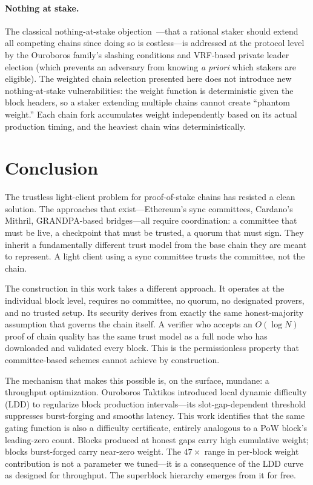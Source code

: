 \documentclass[11pt]{article}
\begin{document}
\paragraph{Nothing at stake.} The classical nothing-at-stake objection~\cite{ouroboros}---that a rational staker should extend all competing chains since doing so is costless---is addressed at the protocol level by the Ouroboros family's slashing conditions and VRF-based private leader election (which prevents an adversary from knowing \emph{a priori} which stakers are eligible). The weighted chain selection presented here does not introduce new nothing-at-stake vulnerabilities: the weight function is deterministic given the block headers, so a staker extending multiple chains cannot create ``phantom weight.'' Each chain fork accumulates weight independently based on its actual production timing, and the heaviest chain wins deterministically.

\section{Conclusion}

The trustless light-client problem for proof-of-stake chains has resisted a clean solution. The approaches that exist---Ethereum's sync committees, Cardano's Mithril, GRANDPA-based bridges---all require coordination: a committee that must be live, a checkpoint that must be trusted, a quorum that must sign. They inherit a fundamentally different trust model from the base chain they are meant to represent. A light client using a sync committee trusts the committee, not the chain.

The construction in this work takes a different approach. It operates at the individual block level, requires no committee, no quorum, no designated provers, and no trusted setup. Its security derives from exactly the same honest-majority assumption that governs the chain itself. A verifier who accepts an $O(\log N)$ proof of chain quality has the same trust model as a full node who has downloaded and validated every block. This is the permissionless property that committee-based schemes cannot achieve by construction.

The mechanism that makes this possible is, on the surface, mundane: a throughput optimization. Ouroboros Taktikos introduced local dynamic difficulty (LDD) to regularize block production intervals---its slot-gap-dependent threshold suppresses burst-forging and smooths latency. This work identifies that the same gating function is also a difficulty certificate, entirely analogous to a PoW block's leading-zero count. Blocks produced at honest gaps carry high cumulative weight; blocks burst-forged carry near-zero weight. The $47\times$ range in per-block weight contribution is not a parameter we tuned---it is a consequence of the LDD curve as designed for throughput. The superblock hierarchy emerges from it for free.
\end{document}
